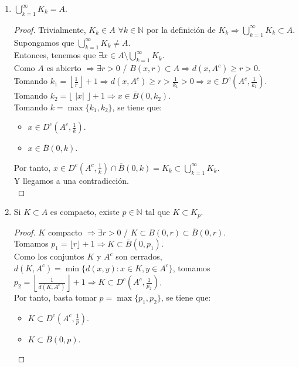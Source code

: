\documentclass[a4paper, 11pt]{article} %
\begin{document}
\begin{enumerate}
\begin{enumerate}[label=\alph*)]
\begin{proof}
{\begin{itemize}
				\end{itemize}
			}
		\end{proof}
		\item $\displaystyle{\bigcup_{k=1}^\infty K_k = A}$.
		\begin{proof}
			\fbox{$\subset$} Trivialmente, $K_k \in A$ $\forall k \in \mathbb{N}$ por la definición de $K_k \Rightarrow \displaystyle{\bigcup_{k=1}^\infty} K_k \subset A$.\\
			\fbox{$\supset$} Supongamos que $\displaystyle{\bigcup_{k=1}^\infty} K_k \neq A$.\\
			Entonces, tenemos que $\exists x \in A \setminus \displaystyle{\bigcup_{k=1}^\infty} K_k$.\\
			Como $A$ es abierto $\Rightarrow \exists r > 0$  /  $B(x,r) \subset A \Rightarrow d(x, A^c) \ge r > 0$.\\
			Tomando $k_1 = \left\lfloor \frac{1}{r} \right\rfloor +1 \Rightarrow d(x,A^c) \ge r > \frac{1}{k_1} > 0 \Rightarrow x \in D^c\left(A^c, \frac{1}{k_1}\right)$.\\
			Tomando $k_2 = \lfloor$ $|x|$ $\rfloor +1 \Rightarrow x \in \overline{B}(0,k_2)$.\\
			Tomando $k = \max\{k_1, k_2\}$, se tiene que:\\
			\begin{itemize}
				\item $x \in D^c\left(A^c, \frac{1}{k} \right)$.
				\item $x \in \overline{B}(0,k)$.
			\end{itemize}
			
			Por tanto, $x \in D^c\left(A^c, \frac{1}{k} \right) \cap \overline{B}(0,k) = K_k \subset \displaystyle{\bigcup_{k=1}^\infty K_k}$.\\
			Y llegamos a una contradicción.\\
		\end{proof}
		\item Si $K \subset A$ es compacto, existe $p \in \mathbb{N}$ tal que $K \subset K_p$.
		\begin{proof}
			$K$ compacto $\Rightarrow \exists r > 0$  /  $K \subset B(0, r) \subset \overline{B}(0,r)$.\\
			Tomamos $p_1 = \lfloor r \rfloor + 1 \Rightarrow K \subset \overline{B}(0, p_1)$.\\
			Como los conjuntos $K$ y $A^c$ son cerrados, $d(K, A^c) = \min\{d(x,y): x \in K, y \in A^c\}$, tomamos $p_2 = \left\lfloor \frac{1}{d(K, A^c)} \right \rfloor + 1 \Rightarrow K \subset D^c\left(A^c, \frac{1}{p_2}\right)$.\\
			Por tanto, basta tomar $p = \max\{p_1,p_2\}$, se tiene que:\\
			\begin{itemize}
				\item $K \subset D^c\left(A^c, \frac{1}{p} \right)$.
				\item $K \subset \overline{B}(0,p)$.
			\end{itemize}
			

\end{proof}
\end{enumerate}
\end{enumerate}
\end{document}
